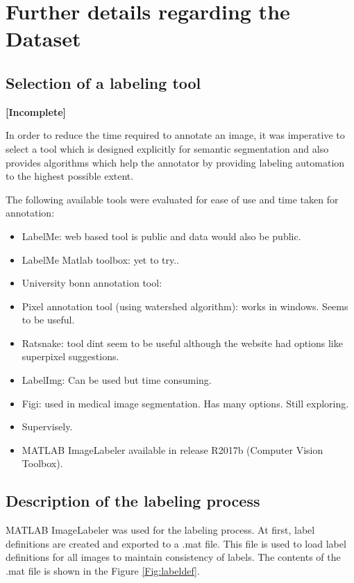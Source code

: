 
\chapter{Further details regarding the Dataset}\label{appendix:dataset}

\section{Selection of a labeling tool}

\textbf{[Incomplete]}

In order to reduce the time required to annotate an image, it was imperative to select a tool which is designed explicitly for semantic segmentation and also provides algorithms which help the annotator by providing labeling automation to the highest possible extent.

The following available tools were evaluated for ease of use and time taken for annotation:
	\begin{itemize}
		\item LabelMe: web based tool is public and data would also be public.
		\item LabelMe Matlab toolbox: yet to try..
		\item University bonn annotation tool:
		\item Pixel annotation tool (using watershed algorithm): works in windows. Seems to be useful.
		\item Ratsnake: tool dint seem to be useful although the website had options like superpixel suggestions.
		\item LabelImg: Can be used but time consuming.
		\item Figi: used in medical image segmentation. Has many options. Still exploring.
		\item Supervisely.
		\item MATLAB ImageLabeler available in release R2017b (Computer Vision Toolbox).
	\end{itemize}

\section{Description of the labeling process}
\label{section:process}
MATLAB ImageLabeler was used for the labeling process. At first, label definitions are created and exported to a .mat file. This file is used to load label definitions for all images to maintain consistency of labels. The contents of the .mat file is shown in the Figure \ref{Fig:labeldef}.
	
